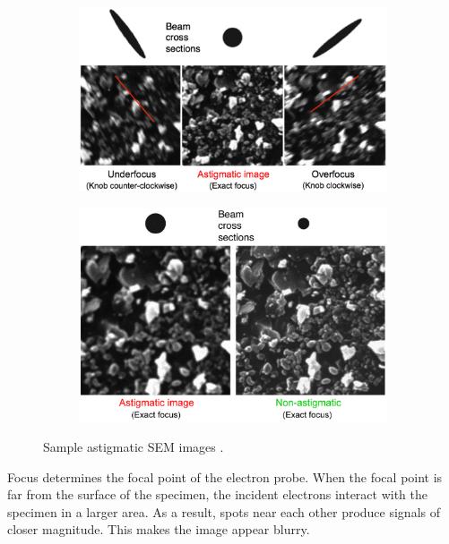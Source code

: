 \documentclass[12pt, conference]{IEEEtran}
\begin{document}
\begin{figure}[htbp]
    \centering
    \begin{subfigure}{0.45\textwidth}
        \centering
        \includegraphics[width=1\textwidth]{Images/B astigmatic a.jpeg}
    \end{subfigure}
    \begin{subfigure}{0.45\textwidth}
        \centering
        \includegraphics[width=1\textwidth]{Images/B astigmatic b.jpeg}
    \end{subfigure}
    \caption{Sample astigmatic SEM images \cite{SEM astigmatism correction}.}
    \label{SEM sample images}
\end{figure}

Focus determines the focal point of the electron probe. When the focal point is far from the surface of the specimen, the incident electrons interact with the specimen in a larger area. As a result, spots near each other produce signals of closer magnitude. This makes the image appear blurry.
\end{document}
